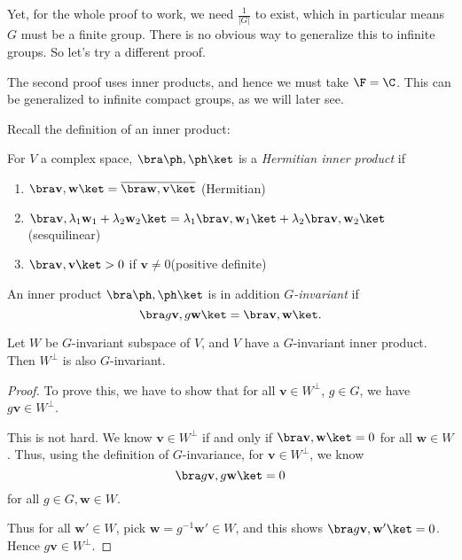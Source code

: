 \documentclass[a4paper]{article}
\begin{document}
Yet, for the whole proof to work, we need $\frac{1}{|G|}$ to exist, which in particular means $G$ must be a finite group. There is no obvious way to generalize this to infinite groups. So let's try a different proof.

The second proof uses inner products, and hence we must take $\F = \C$. This can be generalized to infinite compact groups, as we will later see.

Recall the definition of an inner product:
\begin{defi}
  For $V$ a complex space, $\bra\ph, \ph\ket$ is a \emph{Hermitian inner product} if
  \begin{enumerate}
    \item $\bra \mathbf{v}, \mathbf{w}\ket = \overline{\bra \mathbf{w}, \mathbf{v}\ket}$ \hfill (Hermitian)
    \item $\bra \mathbf{v}, \lambda_1 \mathbf{w}_1 + \lambda_2 \mathbf{w}_2\ket = \lambda_1 \bra \mathbf{v}, \mathbf{w}_1\ket + \lambda_2 \bra \mathbf{v}, \mathbf{w}_2\ket$ \hfill (sesquilinear)
    \item $\bra \mathbf{v}, \mathbf{v}\ket > 0$ if $\mathbf{v} \not= 0$\hfill (positive definite)
  \end{enumerate}
\end{defi}

\begin{defi}
  An inner product $\bra \ph, \ph \ket$ is in addition \emph{$G$-invariant} if
  \[
    \bra g\mathbf{v}, g\mathbf{w}\ket = \bra \mathbf{v}, \mathbf{w}\ket.
  \]
\end{defi}

\begin{prop}
  Let $W$ be $G$-invariant subspace of $V$, and $V$ have a $G$-invariant inner product. Then $W^\perp$ is also $G$-invariant.
\end{prop}

\begin{proof}
  To prove this, we have to show that for all $\mathbf{v} \in W^\perp$, $g \in G$, we have $g \mathbf{v} \in W^\perp$.

  This is not hard. We know $\mathbf{v} \in W^\perp$ if and only if $\bra \mathbf{v}, \mathbf{w}\ket = 0$ for all $\mathbf{w} \in W$. Thus, using the definition of $G$-invariance, for $\mathbf{v} \in W^\perp$, we know
  \[
    \bra g\mathbf{v}, g\mathbf{w}\ket = 0
  \]
  for all $g \in G, \mathbf{w}\in W$.

  Thus for all $\mathbf{w}' \in W$, pick $\mathbf{w} = g^{-1} \mathbf{w}' \in W$, and this shows $\bra g\mathbf{v}, \mathbf{w}'\ket = 0$. Hence $g\mathbf{v} \in W^\perp$.
\end{proof}
\end{document}
